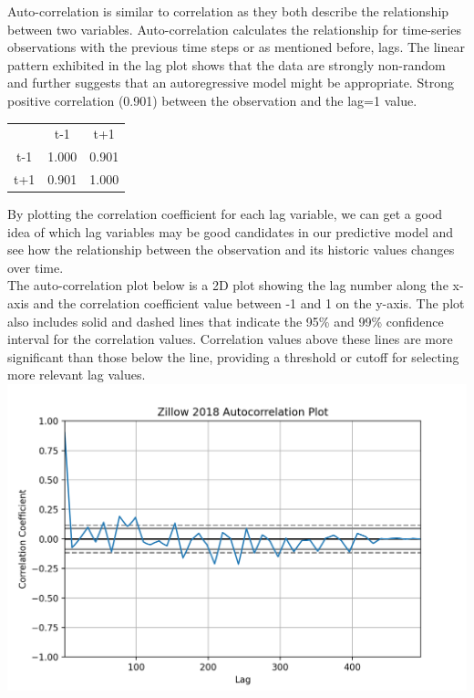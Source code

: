 \documentclass{article}
\begin{document}
	Auto-correlation is similar to correlation as they both describe the relationship between two variables. Auto-correlation calculates the relationship for time-series observations with the previous time steps or as mentioned before, lags. The linear pattern exhibited in the lag plot shows that the data are strongly non-random and further suggests that an autoregressive model might be appropriate. Strong positive correlation (0.901) between the observation and the lag=1 value. \\
	
	\begin{center}
    \begin{tabular}{ c c c }
     \smallskip & t-1 & t+1 \\ 
     t-1 & 1.000 & 0.901 \\  
     t+1 & 0.901 & 1.000    
    \end{tabular}
    \end{center} 
	
	By plotting the correlation coefficient for each lag variable, we can get a good idea of which lag variables may be good candidates in our predictive model and see how the relationship between the observation and its historic values changes over time. \\
	
	The auto-correlation plot below is a 2D plot showing the lag number along the x-axis and the correlation coefficient value between -1 and 1 on the y-axis. The plot also includes solid and dashed lines that indicate the 95\% and 99\% confidence interval for the correlation values. Correlation values above these lines are more significant than those below the line, providing a threshold or cutoff for selecting more relevant lag values. \\
	
	\includegraphics[scale = 0.5]{../plots/2018/zillow2018_autocorrelation1.png} \\
	
\end{document}
